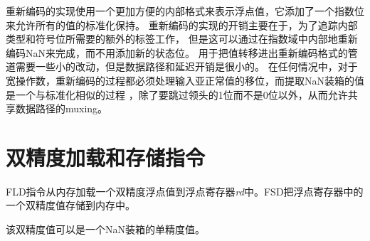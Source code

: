 \begin{commentary}
重新编码的实现使用一个更加方便的内部格式来表示浮点值，它添加了一个指数位来允许所有的值的标准化保持。
重新编码的实现的开销主要在于，为了追踪内部类型和符号位所需要的额外的标签工作，
但是这可以通过在指数域中内部地重新编码NaN来完成，而不用添加新的状态位。
用于把值转移进出重新编码格式的管道需要一些小的改动，但是数据路径和延迟开销是很小的。
在任何情况中，对于宽操作数，重新编码的过程都必须处理输入亚正常值的移位，而提取NaN装箱的值是一个与标准化相似的过程
，除了要跳过领头的1位而不是0位以外，从而允许共享数据路径的muxing。
\end{commentary}

\section{双精度加载和存储指令}
\label{fld_fsd}

FLD指令从内存加载一个双精度浮点值到浮点寄存器{\em rd}中。FSD把浮点寄存器中的一个双精度值存储到内存中。
\begin{commentary}
  该双精度值可以是一个NaN装箱的单精度值。
\end{commentary}

